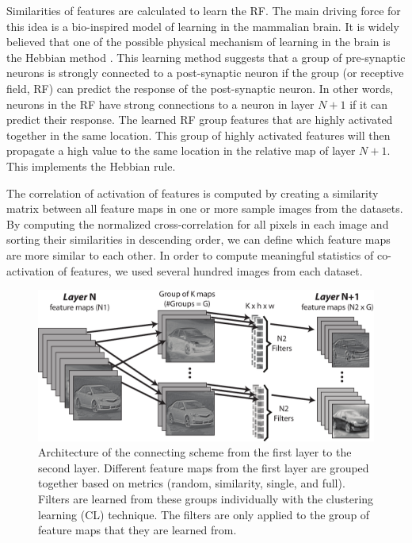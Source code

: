 \documentclass{article} %
\begin{document}
Similarities of features are calculated to learn the RF. 
The main driving force for this idea is a bio-inspired model of learning in the mammalian brain.
It is widely believed that one of the possible physical mechanism of learning in the brain is the Hebbian method \cite{masquelier2007learning}.
This learning method suggests that a group of pre-synaptic neurons is strongly connected to a post-synaptic neuron if the group
(or receptive field, RF) can predict the response of the post-synaptic neuron.
In other words, neurons in the RF have strong connections to a neuron in layer $N+1$ if it can predict their response.
The learned RF group features that are highly activated together in the same location.
This group of highly activated features will then propagate a high value to the same location in the relative map of layer $N+1$.
This implements the Hebbian rule.

The correlation of activation of features is computed by creating a similarity matrix between all feature maps in one or more sample images from the datasets. By computing the normalized cross-correlation for all pixels in each image and sorting their similarities in descending order, we can define which feature maps are more similar to each other. In order to compute meaningful statistics of co-activation of features, we used several hundred images from each dataset.


\begin{figure}
\includegraphics[width=5in]{fig-connection.pdf}
\caption{Architecture of the connecting scheme from the first layer to the second layer. 
Different feature maps from the first layer are grouped together based on metrics (random, similarity, single, and full). 
Filters are learned from these groups individually with the clustering learning (CL) technique.
The filters are only applied to the group of feature maps that they are learned from.}
\label{fig-learnlayers}
\end{figure}
\end{document}
